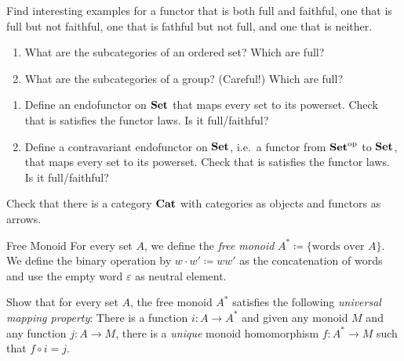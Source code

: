 \begin{exercise}
  Find interesting examples for a functor that is both full and faithful, one that is full but not faithful, one that is fathful but not full, and one that is neither.
\end{exercise}

\begin{exercise}
  \begin{enumerate}
    \item What are the subcategories of an ordered set? Which are full?
    \item What are the subcategories of a group? (Careful!)
      Which are full?
  \end{enumerate}
\end{exercise}

\begin{exercise}
  \begin{enumerate}
    \item Define an endofunctor on $\mathbf{Set}$ that maps every set to its powerset.
      Check that is satisfies the functor laws.
      Is it full/faithful?
    \item Define a contravariant endofunctor on $\mathbf{Set}$, i.e.\ a functor from $\mathbf{Set}^{\mathrm{op}}$ to $\mathbf{Set}$, that maps every set to its powerset.
      Check that is satisfies the functor laws.
      Is it full/faithful?
  \end{enumerate}
\end{exercise}

\begin{exercise}
  Check that there is a category $\mathbf{Cat}$ with categories as objects and functors as arrows.
\end{exercise}

\begin{definition}{Free Monoid}
  For every set $A$, we define the \emph{free monoid} $A^* \coloneqq \lbrace \text{words over $A$} \rbrace$.
  We define the binary operation by $w \cdot w' \coloneqq ww'$ as the concatenation of words and use the empty word $\varepsilon$ as neutral element.
\end{definition}

\begin{exercise}
  Show that for every set $A$, the free monoid $A^*$ satisfies the following \emph{universal mapping property}:
  There is a function $i : A \to A^*$ and given any monoid $M$ and any function $j : A \to M$, there is a \emph{unique} monoid homomorphism $f : A^* \to M$ such that $f \circ i = j$.
\end{exercise}

